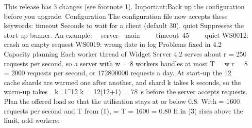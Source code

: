 %
%
This release has 3 changes
(see footnote 1).
%
Important:Back up the configuration before you upgrade.
%
Configuration%
%
The configuration file now accepts these keywords:
%
%
%
timeout%
%
Seconds to wait for a client (default 30).
%
%
quiet%
%
Suppresses the start-up banner.
%
%
%
An example:
%
%
%
\ \ server\ \ main
\ \ \ \ timeout\ 45
\ \ \ \ quiet
%
%
%
%
%
WS0012: crash on empty request
%
%
WS0019: wrong date in log
%
%
%
Problems fixed in 4.2%
%
%
Capacity planning%
%
Each worker thread of Widget Server 4.2 serves about
r = 250 requests per second, so a server with
w = 8 workers handles at most
T = w \cdot r = 8  = 2000 requests per second, or 172800000 requests a day.
%
%
At start-up the 12 cache shards are warmed one after another,
and shard k takes k seconds, so the warm-up takes
\sum_{k=1}^{12} k = {12(12+1)} = 78\ {\rm s} before the server accepts requests.
%
%
Plan the offered load \lambda{} so that the utilisation
\rho{} stays at or below 0.8.
With \lambda = 1600 requests per second and T from
(1),
\rho = {\lambda \over T} = {1600 } = 0.80  If \rho{} in (3) rises above the limit, add workers:
